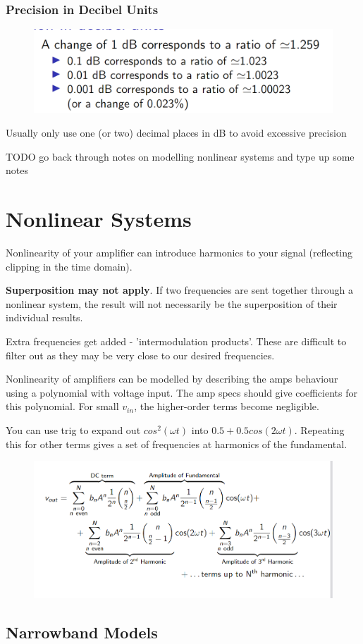\documentclass[12pt]{article}
\begin{document}
\subsubsection{Precision in Decibel Units}
\begin{figure}[h!]
    \centering
    \includegraphics[width=0.5\linewidth]{images/image7.png}
\end{figure}
Usually only use one (or two) decimal places in dB to avoid excessive precision

\begin{flushright}[Lecture on 3.2]\end{flushright}
TODO go back through notes on modelling nonlinear systems and type up some notes

\begin{flushright}[Lecture on 3.3]\end{flushright}

\section{Nonlinear Systems}

Nonlinearity of your amplifier can introduce harmonics to your signal (reflecting clipping in the time domain).

\textbf{Superposition may not apply}. If two frequencies are sent together through a nonlinear system, the result will not necessarily be the superposition of their individual results.

Extra frequencies get added - 'intermodulation products'. These are difficult to filter out as they may be very close to our desired frequencies.

Nonlinearity of amplifiers can be modelled by describing the amps behaviour using a polynomial with voltage input. The amp specs should give coefficients for this polynomial.
For small $v_{in}$, the higher-order terms become negligible.

You can use trig to expand out $cos^2(\omega t)$ into $0.5+0.5cos(2\omega t)$. Repeating this for other terms gives a set of frequencies at harmonics of the fundamental.

\begin{figure}[h!]
    \centering
    \includegraphics[width=0.5\linewidth]{images/image8.png}
\end{figure}

\subsection{Narrowband Models}
\end{document}
